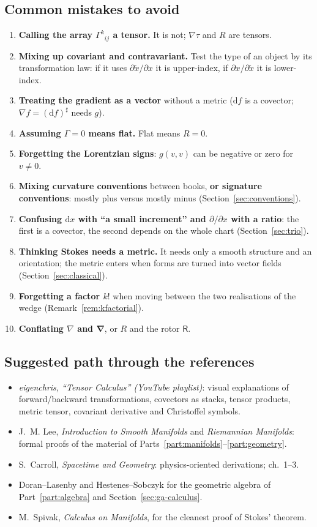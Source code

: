 \documentclass[11pt,a4paper]{article}
\numberwithin{equation}{section}
\theoremstyle{definition}
\theoremstyle{plain}
\newcommand{\dd}{\mathrm{d}}
\newcommand{\vd}{\boldsymbol{\nabla}}               %
\newcommand{\rotor}{\mathsf{R}}                     %
\begin{document}
\subsection{Common mistakes to avoid}
\begin{enumerate}
\item \textbf{Calling the array $\Gamma^k{}_{ij}$ a tensor.} It is not; $\nabla\tau$ and $R$ are tensors.
\item \textbf{Mixing up covariant and contravariant.} Test the type of an object by its transformation law: if it uses $\partial\tilde x/\partial x$ it is upper-index, if $\partial x/\partial\tilde x$ it is lower-index.
\item \textbf{Treating the gradient as a vector} without a metric ($\dd f$ is a covector; $\nabla f=(\dd f)^\sharp$ needs $g$).
\item \textbf{Assuming $\Gamma=0$ means flat.} Flat means $R=0$.
\item \textbf{Forgetting the Lorentzian signs}: $g(v,v)$ can be negative or zero for $v\neq0$.
\item \textbf{Mixing curvature conventions} between books, \textbf{or signature conventions}: mostly plus versus mostly minus (Section~\ref{sec:conventions}).
\item \textbf{Confusing $\dd x$ with ``a small increment'' and $\partial/\partial x$ with a ratio}: the first is a covector, the second depends on the whole chart (Section~\ref{sec:trio}).
\item \textbf{Thinking Stokes needs a metric.} It needs only a smooth structure and an orientation; the metric enters when forms are turned into vector fields (Section~\ref{sec:classical}).
\item \textbf{Forgetting a factor $k!$} when moving between the two realisations of the wedge (Remark~\ref{rem:kfactorial}).
\item \textbf{Conflating $\nabla$ and $\vd$}, or $R$ and the rotor $\rotor$.
\end{enumerate}

\subsection{Suggested path through the references}
\begin{itemize}
\item \emph{eigenchris, ``Tensor Calculus'' (YouTube playlist)}: visual explanations of forward/backward transformations, covectors as stacks, tensor products, metric tensor, covariant derivative and Christoffel symbols.
\item J.~M. Lee, \emph{Introduction to Smooth Manifolds} and \emph{Riemannian Manifolds}: formal proofs of the material of Parts~\ref{part:manifolds}--\ref{part:geometry}.
\item S.~Carroll, \emph{Spacetime and Geometry}: physics-oriented derivations; ch.~1--3.
\item Doran--Lasenby and Hestenes--Sobczyk for the geometric algebra of Part~\ref{part:algebra} and Section~\ref{sec:ga-calculus}.
\item M.~Spivak, \emph{Calculus on Manifolds}, for the cleanest proof of Stokes' theorem.
\end{itemize}
\end{document}
